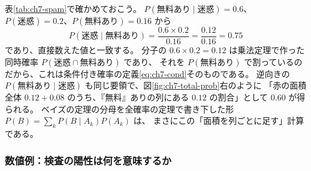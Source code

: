 表\ref{tab:ch7-spam}で確かめておこう。
$P(\text{無料あり} \mid \text{迷惑}) = 0.6$、$P(\text{迷惑}) = 0.2$、$P(\text{無料あり}) = 0.16$ から
\begin{equation*}
  P(\text{迷惑} \mid \text{無料あり}) = \frac{0.6 \times 0.2}{0.16} = \frac{0.12}{0.16} = 0.75
\end{equation*}
であり、直接数えた値と一致する。
分子の $0.6 \times 0.2 = 0.12$ は乗法定理で作った同時確率 $P(\text{迷惑} \cap \text{無料あり})$ であり、
それを $P(\text{無料あり})$ で割っているのだから、これは条件付き確率の定義\eqref{eq:ch7-cond}そのものである。
逆向きの $P(\text{無料あり} \mid \text{迷惑})$ も同じ要領で、図\ref{fig:ch7-total-prob}右のように
「赤の面積全体 $0.12 + 0.08$ のうち、『無料』ありの列にある $0.12$ の割合」として $0.60$ が得られる。
ベイズの定理の分母を全確率の定理で書き下した形 $P(B) = \sum_k P(B \mid A_k)P(A_k)$ は、
まさにこの「面積を列ごとに足す」計算である。

\subsubsection{数値例：検査の陽性は何を意味するか}

